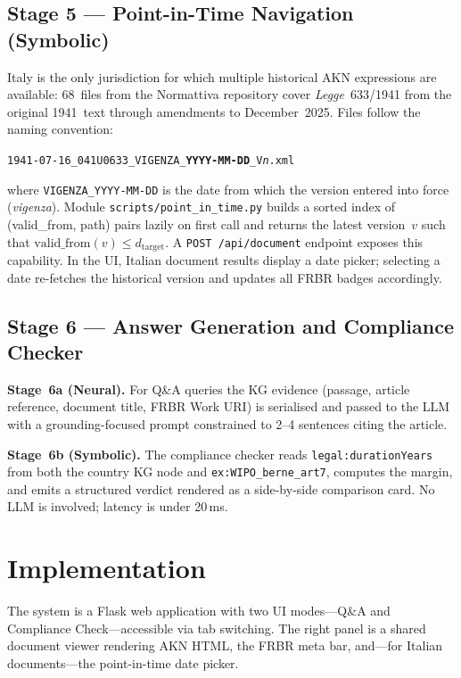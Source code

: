 \documentclass[12pt,a4paper]{article}
\begin{document}
\subsection{Stage 5 --- Point-in-Time Navigation (Symbolic)}
\label{sec:pit}

Italy is the only jurisdiction for which multiple historical AKN
expressions are available: 68~files from the Normattiva repository cover
\emph{Legge}~633/1941 from the original 1941~text through amendments to
December~2025. Files follow the naming convention:
\begin{center}
  \small\texttt{1941-07-16\_041U0633\_VIGENZA\_\textbf{YYYY-MM-DD}\_V\textit{n}.xml}
\end{center}
where \texttt{VIGENZA\_YYYY-MM-DD} is the date from which the version
entered into force (\emph{vigenza}). Module \texttt{scripts/point\_in\_time.py}
builds a sorted index of (valid\_from, path) pairs lazily on first call and
returns the latest version~$v$ such that $\mathrm{valid\_from}(v) \leq
d_{\mathrm{target}}$. A \texttt{POST /api/document} endpoint exposes this
capability. In the UI, Italian document results display a date picker;
selecting a date re-fetches the historical version and updates all FRBR
badges accordingly.

\subsection{Stage 6 --- Answer Generation and Compliance Checker}

\textbf{Stage~6a (Neural).}
For Q\&A queries the KG evidence (passage, article reference, document
title, FRBR Work URI) is serialised and passed to the LLM with a
grounding-focused prompt constrained to 2--4 sentences citing the article.

\textbf{Stage~6b (Symbolic).}
The compliance checker reads \texttt{legal:durationYears} from both the
country KG node and \texttt{ex:WIPO\_berne\_art7}, computes the margin,
and emits a structured verdict rendered as a side-by-side comparison
card. No LLM is involved; latency is under 20\,ms.

\section{Implementation}

The system is a Flask web application with two UI modes---Q\&A and
Compliance Check---accessible via tab switching. The right panel is a
shared document viewer rendering AKN HTML, the FRBR meta bar, and---for
Italian documents---the point-in-time date picker.
\end{document}
